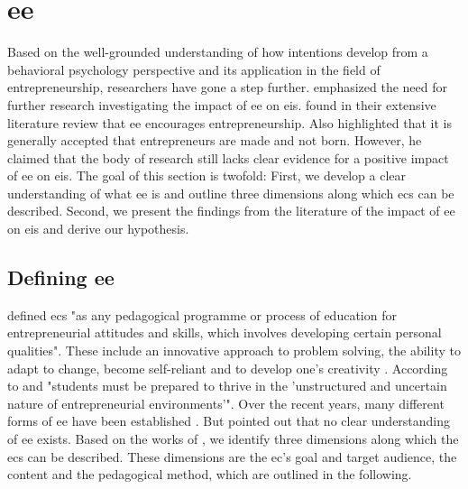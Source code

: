 \section{\acl{ee}}
\label{sec:ee}

Based on the well-grounded understanding of how intentions develop from a behavioral psychology perspective and its application in the field of entrepreneurship, researchers have gone a step further. \citet{fayolle2015impact} emphasized the need for further research investigating the impact of \acf{ee} on \acp{ei}. \citet{gorman1997some} found in their extensive literature review that \ac{ee} encourages entrepreneurship. Also \citet{kuratko2005emergence} highlighted that it is generally accepted that entrepreneurs are made and not born. However, he claimed that the body of research still lacks clear evidence for a positive impact of \ac{ee} on \acp{ei}. The goal of this section is twofold: First, we develop a clear understanding of what \ac{ee} is and outline three dimensions along which \acp{ec} can be described. Second, we present the findings from the literature of the impact of \ac{ee} on \acp{ei} and derive our hypothesis.

\subsection{Defining \acl{ee}}
\label{sec:defining-ee}
\citet[p. 702]{fayolle2006assessing} defined \acp{ec} "as any pedagogical programme or process of education for entrepreneurial attitudes and skills, which involves developing certain personal qualities". These include an innovative approach to problem solving, the ability to adapt to change, become self-reliant and to develop one's creativity \citep{henry2005entrepreneurship}. According to \citet[p.585]{kuratko2005emergence} and \citet{ronstadt1990the} "students must be prepared to thrive in the 'unstructured and uncertain nature of entrepreneurial environments'". Over the recent years, many different forms of \ac{ee} have been established \citep{kuratko2005emergence}. But \citet{pittaway2007entrepreneurship} pointed out that no clear understanding of \ac{ee}  exists. Based on the works of \citet{pittaway2007entrepreneurship,henry2005entrepreneurship,kuratko2005emergence,garavan1994entrepreneurship}, we identify three dimensions along which the \acp{ec} can be described. These dimensions are the \ac{ec}'s goal and target audience, the content and the pedagogical method, which are outlined in the following.

